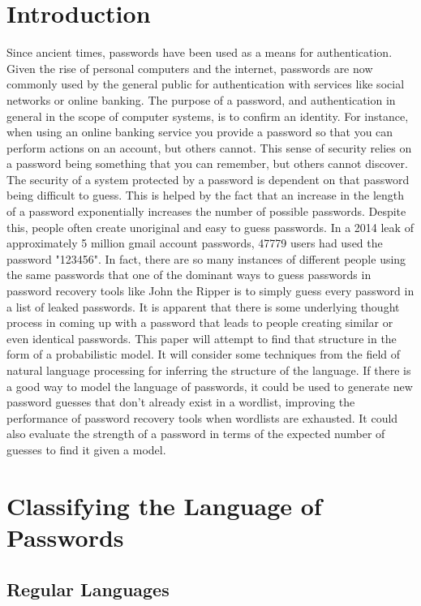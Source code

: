 \documentclass{amsart}
\theoremstyle{definition}
\theoremstyle{remark}
\numberwithin{equation}{section}
\begin{document}
\section{Introduction}
Since ancient times, passwords have been used as a means for authentication. Given the rise of personal computers and the internet, passwords are now commonly used by the general public for authentication with services like social networks or online banking. The purpose of a password, and authentication in general in the scope of computer systems, is to confirm an identity. For instance, when using an online banking service you provide a password so that you can perform actions on an account, but others cannot. This sense of security relies on a password being something that you can remember, but others cannot discover. The security of a system protected by a password is dependent on that password being difficult to guess. This is helped by the fact that an increase in the length of a password exponentially increases the number of possible passwords. Despite this, people often create unoriginal and easy to guess passwords. In a 2014 leak of approximately 5 million gmail account passwords, 47779 users had used the password "123456". In fact, there are so many instances of different people using the same passwords that one of the dominant ways to guess passwords in password recovery tools like John the Ripper is to simply guess every password in a list of leaked passwords. It is apparent that there is some underlying thought process in coming up with a password that leads to people creating similar or even identical passwords. This paper will attempt to find that structure in the form of a probabilistic model. It will consider some techniques from the field of natural language processing for inferring the structure of the language. If there is a good way to model the language of passwords, it could be used to generate new password guesses that don't already exist in a wordlist, improving the performance of password recovery tools when wordlists are exhausted. It could also evaluate the strength of a password in terms of the expected number of guesses to find it given a model.

\section{Classifying the Language of Passwords}
\subsection{Regular Languages}
\end{document}
